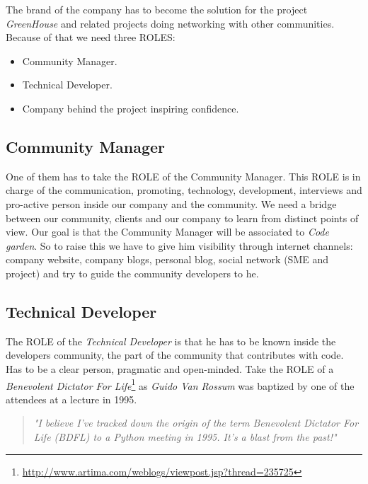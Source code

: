 \documentclass[11pt]{scrartcl}
\begin{document}
\par The brand of the company has to become the solution for the project \emph{GreenHouse} and related projects doing networking with other communities. Because of that we need three ROLES:

\begin{itemize}
	\item Community Manager.
	\item Technical Developer.
	\item Company behind the project inspiring confidence.
\end{itemize}

\subsection{Community Manager}
\label{sub:community-manager}

\par One of them has to take the ROLE of the Community Manager. This ROLE is in charge of the communication, promoting, technology, development, interviews and pro-active person inside our company and the community. We need a bridge between our community, clients and our company to learn from distinct points of view. Our goal is that the Community Manager will be associated to \emph{Code garden}. So to raise this we have to give him visibility through internet channels: company website, company blogs, personal blog, social network (SME and project) and try to guide the community developers to he.


\subsection{Technical Developer}
\label{sub:tech-developer}

\par The ROLE of the \emph{Technical Developer} is that he has to be known inside the developers community, the part of the community that contributes with code. Has to be a clear person, pragmatic and open-minded. Take the ROLE of a \emph{Benevolent Dictator For Life}\footnote{\url{http://www.artima.com/weblogs/viewpost.jsp?thread=235725}} as \emph{Guido Van Rossum} was baptized by one of the attendees at a lecture in 1995.

\begin{quotation}
    \emph{"I believe I've tracked down the origin of the term Benevolent Dictator For Life (BDFL) to a Python meeting in 1995. It's a blast from the past!"}
\end{quotation}
\end{document}
